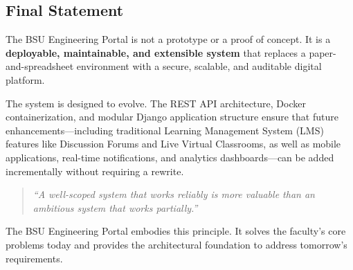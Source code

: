 \subsection{Final Statement}

The BSU Engineering Portal is not a prototype or a proof of concept. It is a \textbf{deployable, maintainable, and extensible system} that replaces a paper-and-spreadsheet environment with a secure, scalable, and auditable digital platform.

The system is designed to evolve. The REST API architecture, Docker containerization, and modular Django application structure ensure that future enhancements---including traditional Learning Management System (LMS) features like Discussion Forums and Live Virtual Classrooms, as well as mobile applications, real-time notifications, and analytics dashboards---can be added incrementally without requiring a rewrite.

\begin{quote}
\textit{``A well-scoped system that works reliably is more valuable than an ambitious system that works partially.''}
\end{quote}

The BSU Engineering Portal embodies this principle. It solves the faculty's core problems today and provides the architectural foundation to address tomorrow's requirements.

